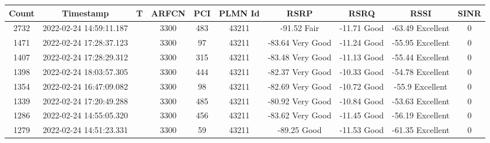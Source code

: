 \begin{longtable*}{|c|c|c|c|c|c|c|c|c|c|}\hline
{}
Count&Timestamp&T&ARFCN&PCI&PLMN Id&RSRP&RSRQ&RSSI&SINR\\\hline\hline
{}2732&2022-02-24 14:59:11.187&&3300&483&43211& -91.52    Fair        & -11.71    Good        & -63.49    Excellent   & 0\\\hline
{}1471&2022-02-24 17:28:37.123&&3300&97&43211& -83.64    Very Good   & -11.24    Good        & -55.95    Excellent   & 0\\\hline
{}1407&2022-02-24 17:28:29.312&&3300&315&43211& -83.48    Very Good   & -11.13    Good        & -55.44    Excellent   & 0\\\hline
{}1398&2022-02-24 18:03:57.305&&3300&444&43211& -82.37    Very Good   & -10.33    Good        & -54.78    Excellent   & 0\\\hline
{}1354&2022-02-24 16:47:09.082&&3300&98&43211& -82.69    Very Good   & -10.72    Good        & -55.9     Excellent   & 0\\\hline
{}1339&2022-02-24 17:20:49.288&&3300&485&43211& -80.92    Very Good   & -10.84    Good        & -53.63    Excellent   & 0\\\hline
{}1286&2022-02-24 14:55:05.320&&3300&456&43211& -83.62    Very Good   & -11.45    Good        & -56.19    Excellent   & 0\\\hline
{}1279&2022-02-24 14:51:23.331&&3300&59&43211& -89.25    Good        & -11.53    Good        & -61.35    Excellent   & 0\\\hline

\end{longtable*}
